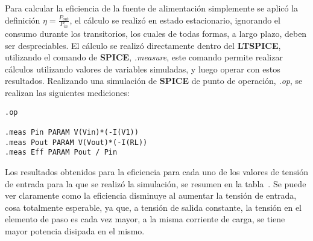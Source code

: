 \vspace{1.5cm}

Para calcular la eficiencia de la fuente de alimentación simplemente se aplicó la definición $\eta = \frac{P_{out}}{P_{in}}$, el cálculo se realizó en estado estacionario, ignorando el consumo durante los transitorios, los cuales de todas formas, a largo plazo, deben ser despreciables. El cálculo se realizó directamente dentro del \textbf{LTSPICE}, utilizando el comando de \textbf{SPICE}, \textit{.measure}, este comando permite realizar cálculos utilizando valores de variables simuladas, y luego operar con estos resultados. Realizando una simulación de \textbf{SPICE} de punto de operación, \textit{.op}, se realizan las siguientes mediciones:

\lstset{language=,xleftmargin=1em,numbers=none}

\lstset{showspaces=false}
\lstset{showstringspaces=false}
\normalfont
\normalsize
{}


\lstset{tabsize=4}

\lstset{numbersep=5pt}

\lstset{inputencoding=utf8/latin1}



\fontsize{10pt}{11pt}
\selectfont


\begin{lstlisting}
.op

.meas Pin PARAM V(Vin)*(-I(V1))
.meas Pout PARAM V(Vout)*(-I(RL))
.meas Eff PARAM Pout / Pin
\end{lstlisting}



Los resultados obtenidos para la eficiencia para cada uno de los valores de tensión de entrada para la que se realizó la simulación, se resumen en la tabla~. Se puede ver claramente como la eficiencia disminuye al aumentar la tensión de entrada, cosa totalmente esperable, ya que, a tensión de salida constante, la tensión en el elemento de paso es cada vez mayor, a la misma corriente de carga, se tiene mayor potencia disipada en el mismo.


